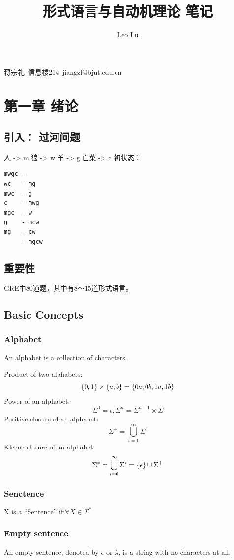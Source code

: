 \documentclass{ctexart}
\title{形式语言与自动机理论 笔记}
\author{Leo Lu}
\DeclarePairedDelimiter{\set}{\{}{\}}
\begin{document}

\maketitle

蒋宗礼\ 信息楼214\ jiangzl@bjut.edu.cn


\section{第一章 绪论}
\subsection{引入： 过河问题}
人 -> m 狼 -> w 羊 -> g 白菜 -> c
初状态： 
\begin{verbatim}
mwgc -
wc   - mg
mwc  - g
c    - mwg
mgc  - w
g    - mcw
mg   - cw
     - mgcw
\end{verbatim}
\subsection{重要性}
GRE中80道题，其中有8～15道形式语言。
\subsection {Basic Concepts}

\subsubsection{Alphabet}
An alphabet is a collection of characters.

Product of two alphabets:	
$$
\set*{0,1} \times \set*{a,b} = \set*{0a, 0b, 1a, 1b}
$$
Power of an alphabet:
$$
\Sigma^0 = {\epsilon}, \Sigma^n = \Sigma^{n-1} \times \Sigma
$$
Positive closure of an alphabet:
$$
\Sigma^+ = \bigcup_{i=1}^{\infty}\Sigma^i
$$
Kleene closure of an alphabet:
$$
\Sigma^* = \bigcup_{i=0}^{\infty}\Sigma^i = \set*{\epsilon} \cup \Sigma^+
$$

\subsubsection{Senctence}
X is a ``Sentence'' if:$\forall X \in \Sigma^*$

\subsubsection{Empty sentence}
An empty sentence, denoted by $\epsilon$ or $\lambda$, is a string with no characters at all.
\end{document}
